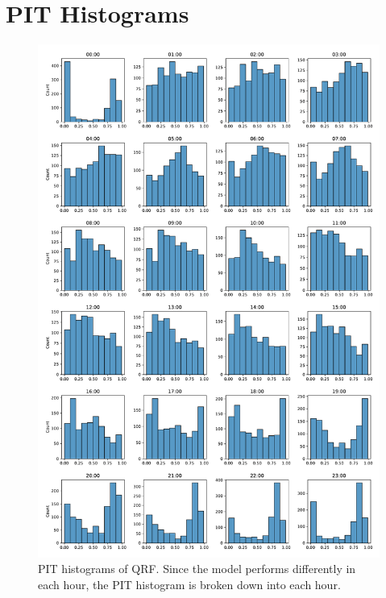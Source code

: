 \section{PIT Histograms}

\begin{figure}[h]%
    \centering
    \includegraphics[width=\textwidth]{plots/pit/pit_by_hour_qrf.pdf}
    \caption[PIT histograms QRF]{PIT histograms of QRF. Since the model performs differently 
    in each hour, the PIT histogram is broken down into each hour.}%
    \label{fig:pit-qrf-by-hour}%
\end{figure}


